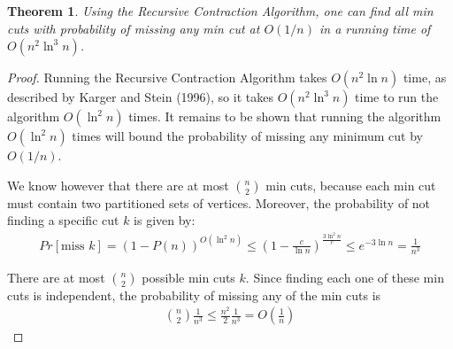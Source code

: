 \documentclass{article}
\theoremstyle{plain}
\newtheorem{theorem}{Theorem}
\begin{document}
\begin{theorem}
Using the Recursive Contraction Algorithm, one can find all min cuts with probability of missing any min cut at $O(1/n)$ in a running time of $O(n^2 \ln^3 n)$.
\end{theorem}
\begin{proof}
Running the Recursive Contraction Algorithm takes $O(n^2 \ln n)$ time, as described by Karger and Stein (1996), so it takes $O(n^2 \ln^3 n)$ time to run the algorithm $O( \ln^2 n)$ times. It remains to be shown that running the algorithm $O(\ln^2 n)$ times will bound the probability of missing any minimum cut by $O(1/n)$.

We know however that there are at most ${n \choose 2}$ min cuts, because each min cut must contain two partitioned sets of vertices. Moreover, the probability of not finding a specific cut $k$ is given by:
\begin{eqnarray}
  Pr[\textrm{miss }k] = (1 - P(n))^{O( \ln^2 n)} \leq \left(1 - \frac{c}{\ln n} \right)^{\frac{3 \ln^2 n}{c}} \leq e^{-3 \ln n} = \frac{1}{n^3}
\end{eqnarray}

There are at most ${n \choose 2}$ possible min cuts $k$. Since finding each one of these min cuts is independent, the probability of missing any of the min cuts is
\begin{eqnarray}
  {n \choose 2} \frac{1}{n^3} \leq \frac{n^2}{2} \frac{1}{n^3} = O \left( \frac{1}{n} \right)
\end{eqnarray}
\end{proof}
\end{document}
